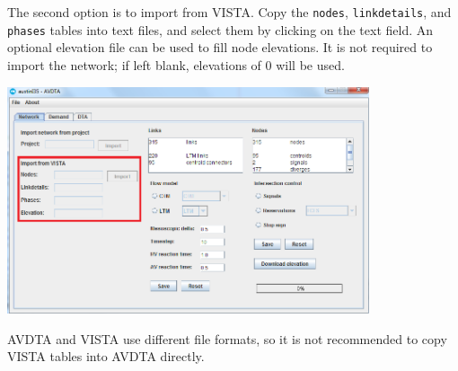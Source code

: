 The second option is to import from VISTA. Copy the \texttt{nodes}, \texttt{linkdetails}, and \texttt{phases} tables into text files, and select them by clicking on the text field. An optional elevation file can be used to fill node elevations. It is not required to import the network; if left blank, elevations of 0 will be used.
\begin{center}
\includegraphics[width=0.8\textwidth]{images/network2.png}
\end{center}
AVDTA and VISTA use different file formats, so it is not recommended to copy VISTA tables into AVDTA directly.

